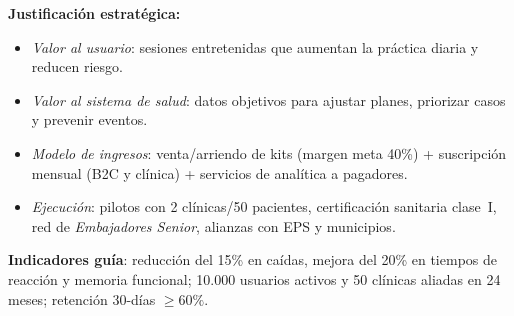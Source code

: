 \textbf{Justificación estratégica:}
\begin{itemize}
    \item \textit{Valor al usuario}: sesiones entretenidas que aumentan la práctica diaria y reducen riesgo.
    \item \textit{Valor al sistema de salud}: datos objetivos para ajustar planes, priorizar casos y prevenir eventos.
    \item \textit{Modelo de ingresos}: venta/arriendo de kits (margen meta 40\%) + suscripción mensual (B2C y clínica) + servicios de analítica a pagadores.
    \item \textit{Ejecución}: pilotos con 2 clínicas/50 pacientes, certificación sanitaria clase~I, red de \emph{Embajadores Senior}, alianzas con EPS y municipios.
\end{itemize}

\textbf{Indicadores guía}: reducción del 15\% en caídas, mejora del 20\% en tiempos de reacción y memoria funcional; 10.000 usuarios activos y 50 clínicas aliadas en 24 meses; retención 30-días \(\geq 60\%\).
